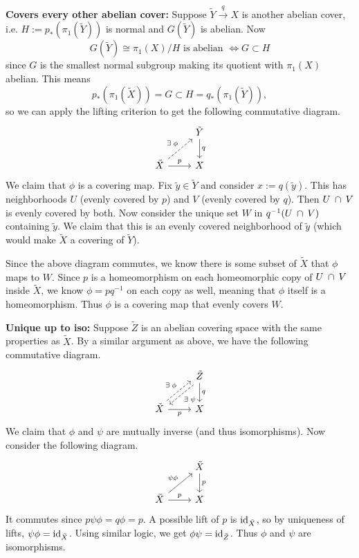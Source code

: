 \documentclass[twoside,10pt]{article}
\begin{document}
\textbf{Covers every other abelian cover:} Suppose $\tilde{Y} \stackrel{q}{\to } X$ is another abelian cover, i.e. $H := p_{*}(\pi_1(\tilde{Y}))$ is normal and $G(\tilde{Y})$ is abelian. Now
\[
	G(\tilde{Y}) \cong \pi_1(X)/H \text{ is abelian } \iff G \subset H
\] since $G$ is the smallest normal subgroup making its quotient with $\pi_1(X)$ abelian. This means
\[
	p_*(\pi_1(\tilde{X})) = G \subset H = q_*(\pi_1(\tilde{Y})),
\] so we can apply the lifting criterion to get the following commutative diagram.
\[
\begin{tikzcd}
	& \tilde{Y} \dar{q} \\
	\tilde{X} \arrow[ur, dashed, "\exists \; \phi"] \rar{p} & X
\end{tikzcd}
\] We claim that $\phi$ is a covering map. Fix $\tilde{y} \in \tilde{Y}$ and consider $x := q(\tilde{y})$. This has neighborhoods $U$ (evenly covered by $p$) and $V$ (evenly covered by $q$). Then $U \operatorname{\;\cap\;} V$ is evenly covered by both. Now consider the unique set $W$ in $q^{-1}(U \operatorname{\;\cap\;} V)$ containing $\tilde{y}$. We claim that this is an evenly covered neighborhood of $\tilde{y}$ (which would make $\tilde{X}$ a covering of $\tilde{Y}$).

Since the above diagram commutes, we know there is some subset of $\tilde{X}$ that $\phi$ maps to $W$. Since $p$ is a homeomorphism on each homeomorphic copy of $U \operatorname{\;\cap\;} V$ inside $\tilde{X}$, we know $\phi = p q^{-1}$ on each copy as well, meaning that $\phi$ itself is a homeomorphism. Thus $\phi$ is a covering map that evenly covers $W$.

\textbf{Unique up to iso:} Suppose $\tilde{Z}$ is an abelian covering space with the same properties as $\tilde{X}$. By a similar argument as above, we have the following commutative diagram.
\[
\begin{tikzcd}
	& \tilde{Z} \arrow[dl, dashed, shift left, "\exists \;\psi"] \dar{q} \\
	\tilde{X} \arrow[ur, dashed, shift left, "\exists \;\phi"] \rar["p"'] & X
\end{tikzcd}
\] 
We claim that $\phi$ and $\psi$ are mutually inverse (and thus isomorphisms). Now consider the following diagram.
\[
\begin{tikzcd}
	& \tilde{X} \dar{p} \\
	\tilde{X} \arrow[ur, "\psi\phi"]\rar{p} & X
\end{tikzcd}
\] It commutes since $p \psi \phi = q \phi = p$. A possible lift of $p$ is $\operatorname{id}_{\tilde{X}}$, so by uniqueness of lifts, $\psi\phi = \operatorname{id}_{\tilde{X}}$. Using similar logic, we get $\phi \psi = \operatorname{id}_{\tilde{Z}}$. Thus $\phi$ and $\psi$ are isomorphisms.
\end{document}
